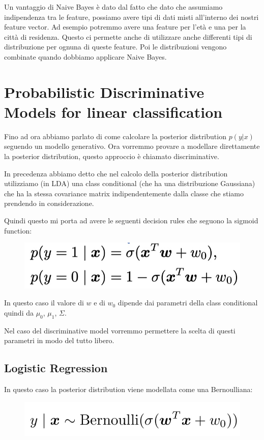 \documentclass[14pt]{extreport}
\begin{document}
Un vantaggio di Naive Bayes è dato dal fatto che dato che assumiamo indipendenza tra le feature, possiamo avere tipi di dati misti all'interno dei
nostri feature vector. Ad esempio potremmo avere una feature per l'età e una per la città di residenza. Questo ci permette anche di utilizzare anche
differenti tipi di distribuzione per ognuna di queste feature. Poi le distribuzioni vengono combinate quando dobbiamo applicare Naive Bayes.

\section{Probabilistic Discriminative Models for linear classification}

Fino ad ora abbiamo parlato di come calcolare la posterior distribution $p(y|x)$ seguendo un modello generativo. Ora vorremmo provare a modellare
direttamente la posterior distribution, questo approccio è chiamato discriminative.

In precedenza abbiamo detto che nel calcolo della posterior distribution utilizziamo (in LDA) una class conditional (che ha una distribuzione
Gaussiana) che ha la stessa covariance matrix indipendentemente dalla classe che stiamo prendendo in considerazione.

Quindi questo mi porta ad avere le seguenti decision rules che seguono la sigmoid function:


\begin{figure}[H]
\centering
\includegraphics[width=0.4\linewidth]{187.jpeg}
\end{figure}

In questo caso il valore di $w$ e di $w_0$ dipende dai parametri della class conditional quindi da $\mu_0$, $\mu_1$, $\Sigma$.

Nel caso del discriminative model vorremmo permettere la scelta di questi parametri in modo del tutto libero.

\subsection{Logistic Regression}

In questo caso la posterior distribution viene modellata come una Bernoulliana:
\begin{figure}[H]
\centering
\includegraphics[width=0.5\linewidth]{188.jpeg}
\end{figure}
\end{document}
